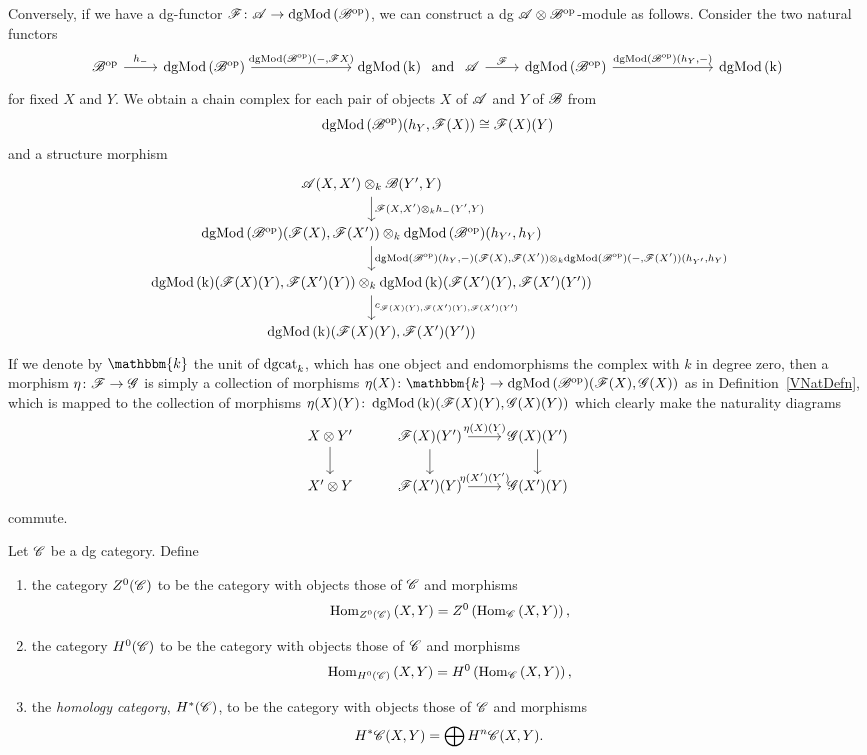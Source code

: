 \documentclass[dissertation.tex]{subfiles}
\begin{document}
\begin{rmk}
  Conversely, if we have a dg-functor $\mathscr{F} \colon \mathscr{A} \to \operatorname{dgMod\left(\mathscr{B}^{\text{op}}\right)}$, we can construct a dg $\mathscr{A} \otimes \mathscr{B}^{\text{op}}$-module as follows.
  Consider the two natural functors
  $$\begin{tikzcd}
    \B^\op \arrow{r}{h_-} & \cdg{\B^\op} \arrow{rrr}{\cdg{\B^\op}(-, \F X)} &&& \cdg{k}
  \end{tikzcd}
  \ \text{and}\ 
  \begin{tikzcd}
    \A \arrow{r}{\F} & \cdg{\B^\op} \arrow{rrr}{\cdg{\B^\op}(h_Y, -)} &&& \cdg{k}
  \end{tikzcd}$$
  for fixed $X$ and $Y$.
  We obtain a chain complex for each pair of objects $X$ of $\mathscr{A}$ and $Y$ of $\mathscr{B}$ from
  $$\operatorname{dgMod\left(\mathscr{B}^{\text{op}}\right)}(h_Y, \mathscr{F}(X)) \cong \mathscr{F}(X)(Y)$$
  and a structure morphism
  $$\begin{tikzcd}
    \A(X,X^\prime) \otimes_k \B(Y^\prime, Y)\arrow{d}{\F(X,X^\prime) \otimes_k h_-(Y^\prime, Y)}\\
    \cdg{\B^\op}(\F(X), \F(X^\prime)) \otimes_k \cdg{\B^\op}(h_{Y^\prime}, h_Y)\arrow{d}{\cdg{\B^\op}(h_Y, -)(\F(X),\F(X^\prime)) \otimes_k \cdg{\B^\op}(-, \F(X^\prime))(h_{Y^\prime}, h_Y)}\\
    \cdg{k}(\F(X)(Y), \F(X^\prime)(Y)) \otimes_k \cdg{k}(\F(X^\prime)(Y), \F(X^\prime)(Y^\prime))\arrow{d}{c_{\F(X)(Y), \F(X^\prime)(Y), \F(X^\prime)(Y^\prime)}}\\
    \cdg{k}(\F(X)(Y), \F(X^\prime)(Y^\prime))
  \end{tikzcd}$$
  If we denote by $\mathbbm{k}$ the unit of $\operatorname{dgcat}_k$, which has one object and endomorphisms the complex with $k$ in degree zero, then a morphism $\eta \colon \mathscr{F} \to \mathscr{G}$ is simply a collection of morphisms $\eta(X) \colon \mathbbm{k} \to \cdg{\B^\op}(\F(X),\G(X))$ as in Definition~\ref{VNatDefn}, which is mapped to the collection of morphisms $\eta(X)(Y) \colon \operatorname{dgMod\left(k\right)}(\mathscr{F}(X)(Y),\mathscr{G}(X)(Y))$ which clearly make the naturality diagrams
  $$\begin{tikzcd}
    X \otimes Y^\prime \arrow{d} & \F(X)(Y^\prime) \arrow{r}{\eta(X)(Y)}\arrow{d} & \G(X)(Y^\prime)\arrow{d}\\
    X^\prime \otimes Y & \F(X^\prime)(Y) \arrow{r}{\eta(X^\prime)(Y^\prime)} & \G(X^\prime)(Y)
  \end{tikzcd}$$
  commute.
\end{rmk}

\begin{defn}
  Let $\mathscr{C}$ be a dg category.
  Define
  \begin{enumerate}
  \item
    the category $Z^0(\mathscr{C})$ to be the category with objects those of $\mathscr{C}$ and morphisms
    $$\operatorname{Hom}_{Z^0(\mathscr{C})}\left(X,Y\right) = Z^0\left(\operatorname{Hom}_{\mathscr{C}}\left(X,Y\right)\right),$$
  \item
    the category $H^0(\mathscr{C})$ to be the category with objects those of $\mathscr{C}$ and morphisms
    $$\operatorname{Hom}_{H^0(\mathscr{C})}\left(X,Y\right) = H^0\left(\operatorname{Hom}_{\mathscr{C}}\left(X,Y\right)\right),$$
  \item
    the {\it homology category}, $H^\ast(\mathscr{C})$, to be the category with objects those of $\mathscr{C}$ and morphisms 
    $$H^\ast\mathscr{C}(X,Y) = \bigoplus H^n\mathscr{C}(X,Y).$$
  \end{enumerate}
\end{defn}
\end{document}
